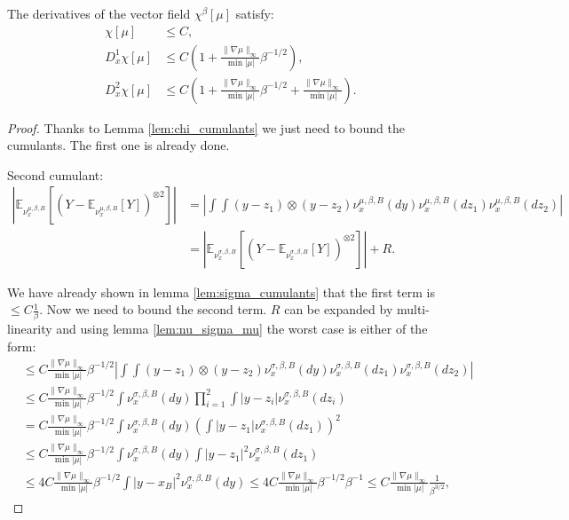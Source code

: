 \documentclass[10pt,a4paper]{amsart}
\begin{document}
\begin{proposition}
\label{prop:chi_bounds}
The derivatives of the vector field $\chi^\beta[\mu]$ satisfy:
\begin{align*}
\chi[\mu]&\leq C,\\
D^1_x\chi[\mu]&\leq C\left(1+\frac{\|\nabla \mu\|_\infty}{\min |\mu|}\beta^{-1/2}\right),\\
D^2_x\chi[\mu]&\leq C\left(1+\frac{\|\nabla \mu\|_\infty}{\min |\mu|}\beta^{-1/2}+\frac{\|\nabla \mu\|_\infty}{\min |\mu|}\right).
\end{align*}
\end{proposition}

\begin{proof}
Thanks to Lemma \ref{lem:chi_cumulants} we just need to bound the cumulants. The first one is already done.

Second cumulant:
\begin{align*}
\left|\mathbb{E}_{\nu_x^{\mu,\beta,B}}[\left(Y-\mathbb{E}_{\nu_x^{\mu,\beta,B}}[Y]\right)^{\otimes 2}]\right|&=\left|\int \int (y-z_1)\otimes(y-z_2) \nu_x^{\mu,\beta,B}(dy) \nu_x^{\mu,\beta,B}(dz_1) \nu_x^{\mu,\beta,B}(dz_2) \right|\\
&=\left|\mathbb{E}_{\nu_x^{\sigma,\beta,B}}[\left(Y-\mathbb{E}_{\nu_x^{\sigma,\beta,B}}[Y]\right)^{\otimes 2}]\right|+R.
\end{align*}

We have already shown in lemma \ref{lem:sigma_cumulants} that the first term is $\leq C\frac{1}{\beta}$. Now we need to bound the second term. $R$ can be expanded by multi-linearity and using lemma \ref{lem:nu_sigma_mu} the worst case is either of the form:
\begin{align*}
&\leq C\frac{\|\nabla \mu\|_\infty}{\min |\mu|}\beta^{-1/2}\left|\int\int (y-z_1)\otimes(y-z_2) \nu_x^{\sigma, \beta, B}(dy) \nu_x^{\sigma, \beta, B}(dz_1) \nu_x^{\sigma, \beta, B}(dz_2)\right|\\
&\leq C \frac{\|\nabla \mu\|_\infty}{\min |\mu|}\beta^{-1/2}\int \nu_x^{\sigma, \beta, B}(dy )\prod_{i=1}^2 \int |y-z_i| \nu_x^{\sigma, \beta, B}(dz_i)\\
&= C\frac{\|\nabla \mu\|_\infty}{\min |\mu|}\beta^{-1/2}\int \nu_x^{\sigma, \beta, B}(dy )\left( \int |y-z_1| \nu_x^{\sigma, \beta, B}(dz_1)\right)^2\\
&\leq C\frac{\|\nabla \mu\|_\infty}{\min |\mu|}\beta^{-1/2}\int \nu_x^{\sigma, \beta, B}(dy )\int |y-z_1| ^2\nu_x^{\sigma, \beta, B}(dz_1)\\
&\leq   4C\frac{\|\nabla \mu\|_\infty}{\min |\mu|}\beta^{-1/2}\int |y-x_B|^2\nu_x^{\sigma, \beta, B}(dy)\leq 4C\frac{\|\nabla \mu\|_\infty}{\min |\mu|}\beta^{-1/2}\beta^{-1}\leq C\frac{\|\nabla \mu\|_\infty}{\min |\mu|}\frac{1}{\beta^{3/2}},
\end{align*}


\end{proof}
\end{document}
